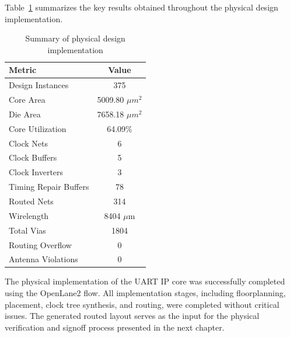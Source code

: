 Table~\ref{tab:physical_summary} summarizes the key results obtained throughout the physical design implementation.

\begin{table}[!htbp]
\centering
\caption{Summary of physical design implementation}
\label{tab:physical_summary}
\begin{tabular}{lc}
\toprule
Metric & Value\\
\midrule
Design Instances & 375\\
Core Area & 5009.80 $\mu m^2$\\
Die Area & 7658.18 $\mu m^2$\\
Core Utilization & 64.09\%\\
Clock Nets & 6\\
Clock Buffers & 5\\
Clock Inverters & 3\\
Timing Repair Buffers & 78\\
Routed Nets & 314\\
Wirelength & 8404 $\mu$m\\
Total Vias & 1804\\
Routing Overflow & 0\\
Antenna Violations & 0\\
\bottomrule
\end{tabular}
\end{table}

The physical implementation of the UART IP core was successfully completed using the OpenLane2 flow. All implementation stages, including floorplanning, placement, clock tree synthesis, and routing, were completed without critical issues. The generated routed layout serves as the input for the physical verification and signoff process presented in the next chapter.